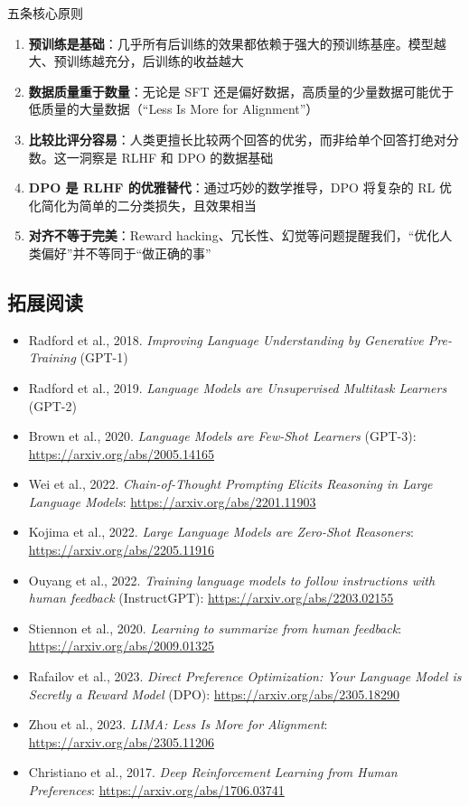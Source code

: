 \documentclass[a4paper]{article}
\begin{document}
\begin{importantbox}{五条核心原则}
\begin{enumerate}
    \item \textbf{预训练是基础}：几乎所有后训练的效果都依赖于强大的预训练基座。模型越大、预训练越充分，后训练的收益越大
    \item \textbf{数据质量重于数量}：无论是 SFT 还是偏好数据，高质量的少量数据可能优于低质量的大量数据（``Less Is More for Alignment''）
    \item \textbf{比较比评分容易}：人类更擅长比较两个回答的优劣，而非给单个回答打绝对分数。这一洞察是 RLHF 和 DPO 的数据基础
    \item \textbf{DPO 是 RLHF 的优雅替代}：通过巧妙的数学推导，DPO 将复杂的 RL 优化简化为简单的二分类损失，且效果相当
    \item \textbf{对齐不等于完美}：Reward hacking、冗长性、幻觉等问题提醒我们，``优化人类偏好''并不等同于``做正确的事''
\end{enumerate}
\end{importantbox}

\subsection{拓展阅读}

\begin{itemize}
    \item Radford et al., 2018. \textit{Improving Language Understanding by Generative Pre-Training} (GPT-1)
    \item Radford et al., 2019. \textit{Language Models are Unsupervised Multitask Learners} (GPT-2)
    \item Brown et al., 2020. \textit{Language Models are Few-Shot Learners} (GPT-3): \url{https://arxiv.org/abs/2005.14165}
    \item Wei et al., 2022. \textit{Chain-of-Thought Prompting Elicits Reasoning in Large Language Models}: \url{https://arxiv.org/abs/2201.11903}
    \item Kojima et al., 2022. \textit{Large Language Models are Zero-Shot Reasoners}: \url{https://arxiv.org/abs/2205.11916}
    \item Ouyang et al., 2022. \textit{Training language models to follow instructions with human feedback} (InstructGPT): \url{https://arxiv.org/abs/2203.02155}
    \item Stiennon et al., 2020. \textit{Learning to summarize from human feedback}: \url{https://arxiv.org/abs/2009.01325}
    \item Rafailov et al., 2023. \textit{Direct Preference Optimization: Your Language Model is Secretly a Reward Model} (DPO): \url{https://arxiv.org/abs/2305.18290}
    \item Zhou et al., 2023. \textit{LIMA: Less Is More for Alignment}: \url{https://arxiv.org/abs/2305.11206}
    \item Christiano et al., 2017. \textit{Deep Reinforcement Learning from Human Preferences}: \url{https://arxiv.org/abs/1706.03741}
\end{itemize}
\end{document}
